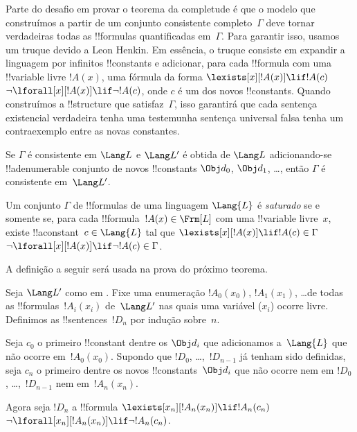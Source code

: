 \documentclass[../../../include/open-logic-section]{subfiles}
\begin{document}


\begin{explain}
Parte do desafio em provar o teorema da completude é que o
modelo que construímos a partir de um conjunto consistente completo~$\Gamma$ deve tornar
verdadeiras todas as !!{formula}s quantificadas em~$\Gamma$.  Para
garantir isso, usamos um truque devido a Leon Henkin.  Em essência, o
truque consiste em expandir a linguagem por infinitos !!{constant}s
e adicionar, para cada !!{formula} com uma !!{variable} livre $!A(x)$, uma
fórmula da forma
      {$\lexists[x][!A(x)] \lif !A(c)$}
      {$\lnot\lforall[x][!A(x)] \lif \lnot !A(c)$},
onde $c$ é um dos novos !!{constant}s.  Quando construímos a
!!{structure} que satisfaz~$\Gamma$, isso garantirá que cada
{sentença existencial verdadeira tenha uma testemunha}
{sentença universal falsa tenha um contraexemplo}
entre as novas constantes.
\end{explain}

\begin{prop}
Se $\Gamma$ é consistente em $\Lang L$ e $\Lang L'$ é obtida de
$\Lang L$ adicionando-se !!a{denumerable} conjunto de novos !!{constant}s $\Obj d_0$,
$\Obj d_1$, \dots, então $\Gamma$ é consistente em~$\Lang L'$.
\end{prop}

\begin{defn}
Um conjunto $\Gamma$ de !!{formula}s de uma linguagem $\Lang {L}$ é
\emph{saturado} se e somente se, para cada !!{formula}~$!A(x) \in \Frm[L]$ com uma
!!{variable} livre~$x$, existe !!a{constant}~$c \in \Lang{L}$ tal
que
      {$\lexists[x][!A(x)] \lif !A(c) \in \Gamma$}
      {$\lnot\lforall[x][!A(x)] \lif \lnot !A(c) \in \Gamma$}.
\end{defn}

A definição a seguir será usada na prova do próximo teorema.

\begin{defn}
Seja $\Lang L'$ como em .  Fixe uma enumeração
$!A_0(x_0)$, $!A_1(x_1)$, \dots de todas as !!{formula}s~$!A_i(x_i)$
de~$\Lang L'$ nas quais uma variável ($x_i$) ocorre livre.  Definimos
as !!{sentence}s~$!D_n$ por indução sobre~$n$.

Seja $c_0$ o primeiro !!{constant} dentre os $\Obj d_i$ que adicionamos
a~$\Lang{L}$ que não ocorre em~$!A_0(x_0)$.  Supondo que
$!D_0$, \dots,~$!D_{n-1}$ já tenham sido definidas, seja $c_n$ o
primeiro dentre os novos !!{constant}s~$\Obj d_i$ que não ocorre nem em
$!D_0$, \dots,~$!D_{n-1}$ nem em~$!A_n(x_n)$.

Agora seja $!D_{n}$ a !!{formula} 
{$\lexists[x_{n}][!A_{n}(x_{n})] \lif
  !A_{n}(c_{n})$}{$\lnot\lforall[x_{n}][!A_{n}(x_{n})] \lif \lnot
  !A_{n}(c_{n})$}.
\end{defn}
\end{document}

